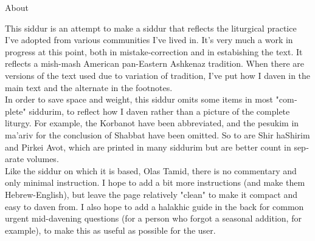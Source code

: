 \documentclass[twoside, openany, parskip=half, 11pt]{book}
\begin{document}
\begin{minipage}{\textwidth}

\begin{english}
\begin{center} %
\begin{LARGE}
About
\end{LARGE}
\end{center}

This siddur is an attempt to make a siddur that reflects the liturgical practice I've adopted from various communities I've lived in. It's very much a work in progress at this point, both in mistake-correction and in estabishing the text. It reflects a mish-mash American pan-Eastern Ashkenaz tradition. When there are versions of the text used due to variation of tradition, I've put how I daven in the main text and the alternate in the footnotes.\\

In order to save space and weight, this siddur omits some items in most "complete" siddurim, to reflect how I daven rather than a picture of the complete liturgy. For example, the Korbanot have been abbreviated, and the pesukim in ma'ariv for the conclusion of Shabbat have been omitted. So to are Shir haShirim and Pirkei Avot, which are printed in many siddurim but are better count in separate volumes.\\

Like the siddur on which it is based, Olas Tamid, there is no commentary and only minimal instruction. I hope to add a bit more instructions (and make them Hebrew-English), but leave the page relatively "clean" to make it compact and easy to daven from. I also hope to add a halakhic guide in the back for common urgent mid-davening questions (for a person who forgot a seasonal addition, for example), to make this as useful as possible for the user.


\end{english}

\end{minipage}
\end{document}
